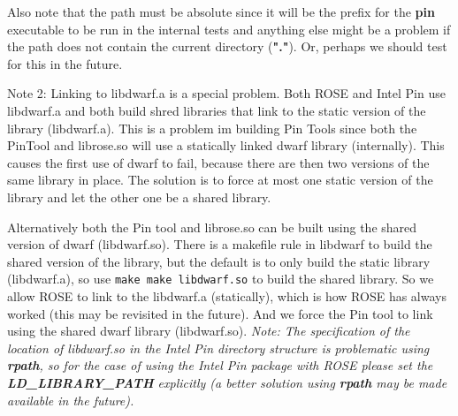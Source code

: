 Also note that the path must be absolute since it will be the
prefix for the {\bf pin} executable to be run in the internal tests and
anything else might be a problem if the path does not contain the 
current directory ({\bf "."}). Or, perhaps we should test for this
in the future.

Note 2: Linking to libdwarf.a is a special problem.  
Both ROSE and Intel Pin use libdwarf.a and both build shred libraries 
that link to the static version of the library (libdwarf.a).  This is 
a problem im building Pin Tools since both the PinTool and librose.so will use 
a statically linked dwarf library (internally).  This causes the first
use of dwarf to fail, because there are then two versions of the same 
library in place.  The solution is to force at most one static version 
of the library and let the other one be a shared library.

   Alternatively both the Pin tool and librose.so can be
built using the shared version of dwarf (libdwarf.so).
There is a makefile rule in libdwarf to build the shared
version of the library, but the default is to only build the
static library (libdwarf.a), so use {\tt make make libdwarf.so}
to build the shared library.  So we allow ROSE to link to
the libdwarf.a (statically), which is how ROSE has always
worked (this may be revisited in the future).  And we force 
the Pin tool to link using the shared dwarf library (libdwarf.so).
{\em Note: The specification of the location of libdwarf.so in the Intel Pin 
directory structure is problematic using {\bf rpath}, so for the case of 
using the Intel Pin package with ROSE please set the {\bf LD\_LIBRARY\_PATH}
explicitly (a better solution using {\bf rpath} may be made available in 
the future).}


 
